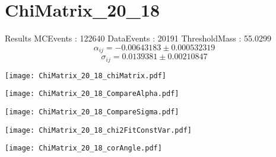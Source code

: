 \documentclass[a4paper,12pt]{article}
\begin{document}
\section{ChiMatrix\_20\_18}
\begin{minipage}{0.49\linewidth} Results \newline
MCEvents : 122640\newline
DataEvents : 20191 \newline
ThresholdMass : 55.0299\\
$$\alpha_{ij} = -0.00643183\pm 0.000532319$$
$$\sigma_{ij} = 0.0139381\pm 0.00210847$$
\end{minipage}\hfill
\begin{minipage}{0.49\linewidth} 
\texttt{[image: ChiMatrix\_20\_18\_chiMatrix.pdf]}\\
\end{minipage}
\hfill
\begin{minipage}{0.49\linewidth} 
\texttt{[image: ChiMatrix\_20\_18\_CompareAlpha.pdf]}\\
\end{minipage}
\hfill
\begin{minipage}{0.49\linewidth} 
\texttt{[image: ChiMatrix\_20\_18\_CompareSigma.pdf]}\\
\end{minipage}
\begin{minipage}{0.49\linewidth} 
\texttt{[image: ChiMatrix\_20\_18\_chi2FitConstVar.pdf]}\\
\end{minipage}
\hfill
\begin{minipage}{0.49\linewidth} 
\texttt{[image: ChiMatrix\_20\_18\_corAngle.pdf]}\\
\end{minipage}
\end{document}

